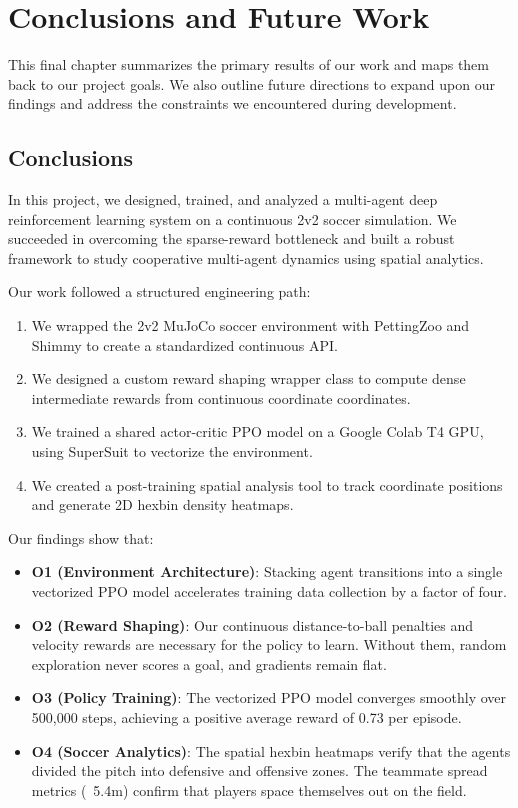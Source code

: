 \chapter{Conclusions and Future Work}
\label{ch:conclusion}

This final chapter summarizes the primary results of our work and maps them back to our project goals. We also outline future directions to expand upon our findings and address the constraints we encountered during development.

\section{Conclusions}
\label{sec:conclusions}

In this project, we designed, trained, and analyzed a multi-agent deep reinforcement learning system on a continuous 2v2 soccer simulation. We succeeded in overcoming the sparse-reward bottleneck and built a robust framework to study cooperative multi-agent dynamics using spatial analytics.

Our work followed a structured engineering path:
\begin{enumerate}
    \item We wrapped the 2v2 MuJoCo soccer environment with PettingZoo and Shimmy to create a standardized continuous API.
    \item We designed a custom reward shaping wrapper class to compute dense intermediate rewards from continuous coordinate coordinates.
    \item We trained a shared actor-critic PPO model on a Google Colab T4 GPU, using SuperSuit to vectorize the environment.
    \item We created a post-training spatial analysis tool to track coordinate positions and generate 2D hexbin density heatmaps.
\end{enumerate}

Our findings show that:
\begin{itemize}
    \item \textbf{O1 (Environment Architecture)}: Stacking agent transitions into a single vectorized PPO model accelerates training data collection by a factor of four.
    \item \textbf{O2 (Reward Shaping)}: Our continuous distance-to-ball penalties and velocity rewards are necessary for the policy to learn. Without them, random exploration never scores a goal, and gradients remain flat.
    \item \textbf{O3 (Policy Training)}: The vectorized PPO model converges smoothly over 500,000 steps, achieving a positive average reward of 0.73 per episode.
    \item \textbf{O4 (Soccer Analytics)}: The spatial hexbin heatmaps verify that the agents divided the pitch into defensive and offensive zones. The teammate spread metrics (~5.4m) confirm that players space themselves out on the field.
\end{itemize}

